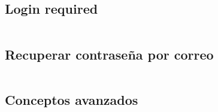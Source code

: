 \documentclass[xcolor=dvipsnames]{beamer}
\begin{document}
\subsection{Login required}
\begin{frame}[fragile]
\begin{verbatim}

\end{verbatim}
\end{frame}

\subsection{Recuperar contraseña por correo}
\begin{frame}[fragile]
\begin{verbatim}

\end{verbatim}
\end{frame}

\subsection{Conceptos avanzados}
\begin{frame}[fragile]
\begin{verbatim}

\end{verbatim}
\end{frame}
\end{document}
